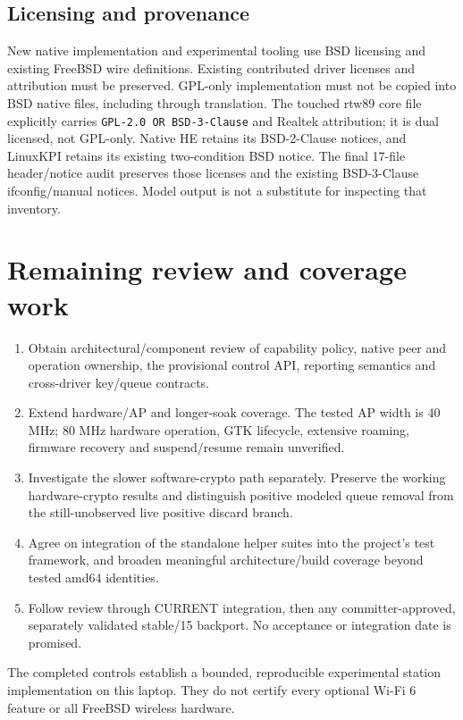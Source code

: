 \documentclass[11pt,letterpaper,oneside]{article}
\newcommand{\code}[1]{\texttt{\small #1}}
\begin{document}
\subsection{Licensing and provenance}
New native implementation and experimental tooling use BSD licensing and existing FreeBSD wire definitions. Existing contributed driver licenses and attribution must be preserved. GPL-only implementation must not be copied into BSD native files, including through translation. The touched rtw89 core file explicitly carries \code{GPL-2.0 OR BSD-3-Clause} and Realtek attribution; it is dual licensed, not GPL-only. Native HE retains its BSD-2-Clause notices, and LinuxKPI retains its existing two-condition BSD notice. The final 17-file header/notice audit preserves those licenses and the existing BSD-3-Clause ifconfig/manual notices. Model output is not a substitute for inspecting that inventory.

\section{Remaining review and coverage work}
\begin{enumerate}
\item Obtain architectural/component review of capability policy, native peer and operation ownership, the provisional control API, reporting semantics and cross-driver key/queue contracts.
\item Extend hardware/AP and longer-soak coverage. The tested AP width is 40 MHz; 80 MHz hardware operation, GTK lifecycle, extensive roaming, firmware recovery and suspend/resume remain unverified.
\item Investigate the slower software-crypto path separately. Preserve the working hardware-crypto results and distinguish positive modeled queue removal from the still-unobserved live positive discard branch.
\item Agree on integration of the standalone helper suites into the project's test framework, and broaden meaningful architecture/build coverage beyond tested amd64 identities.
\item Follow review through CURRENT integration, then any committer-approved, separately validated stable/15 backport. No acceptance or integration date is promised.
\end{enumerate}
The completed controls establish a bounded, reproducible experimental station implementation on this laptop. They do not certify every optional Wi-Fi 6 feature or all FreeBSD wireless hardware.
\end{document}
